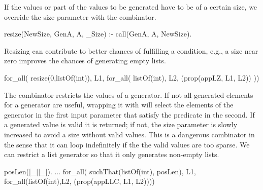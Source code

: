 If the values or part of the values to be generated have to be of a
certain size, we override the size parameter with the 
combinator.
%
\begin{yapcode}
 resize(NewSize, GenA, A, _Size) :- call(GenA, A, NewSize).
\end{yapcode}
%
Resizing can contribute to better chances of fulfilling a condition,
e.g., a size near zero improves the chances of generating empty lists.
%
\begin{yapcode}
 for_all(  resize(0,listOf(int)),  L1,
   for_all( listOf(int), L2, (prop({appLZ, L1, L2})) ))
\end{yapcode}


The  combinator restricts the values of a generator.
%
If not all generated elements for a generator are useful, wrapping it
with  will select the elements of the generator in the
first input parameter that satisfy the predicate in the second.
%
If a generated value is valid it is returned; if not, the size parameter is
slowly increased to avoid a size without valid values.
%
This is a dangerous combinator in the sense that it can loop
indefinitely  if the the valid values are too sparse.
%
We can restrict a list generator so that it only generates non-empty
lists.
%
\begin{yapcode}
 posLen([_||_]).
 ...
   for_all(  suchThat(listOf(int), posLen),  L1,
     for_all(listOf(int),L2, (prop({appLLC, L1, L2}))))
\end{yapcode}

                                                        


